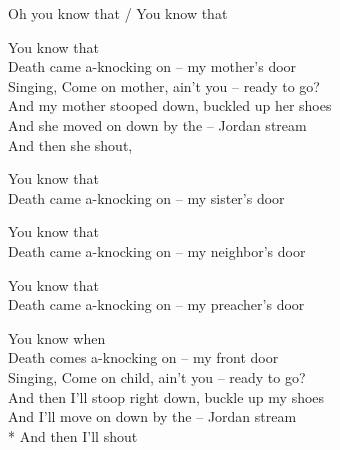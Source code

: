 


Oh you know that / You know that

\contd
{}

You know that\\
Death came a-knocking on – my mother’s door\\
Singing, Come on mother, ain’t you – ready to go?\\
And my mother stooped down, buckled up her shoes\\
And she moved on down by the – Jordan stream\\
\vin And then she shout,



\versemark
You know that\\
Death came a-knocking on – my sister’s door\simile

\versemark
You know that\\
Death came a-knocking on – my neighbor’s door\simile

\versemark
You know that\\
Death came a-knocking on – my preacher’s door\simile

\versemark
You know when\\
Death comes a-knocking on – my front door\\
Singing, Come on child, ain’t you – ready to go?\\
And then I’ll stoop right down, buckle up my shoes\\
And I’ll move on down by the – Jordan stream\\*
\vin And then I’ll shout 


